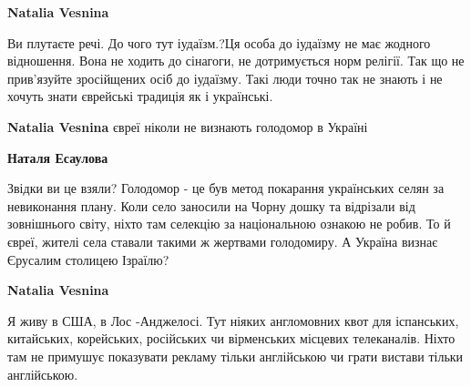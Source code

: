 \begin{itemize}
\begin{itemize}
\begin{itemize}
\textbf{Natalia Vesnina} 

Ви плутаєте речі. До чого тут іудаїзм.?Ця особа до іудаїзму не має жодного
відношення. Вона не ходить до сінагоги, не дотримується норм релігії. Так що не
прив'язуйте зросійщених осіб до іудаїзму. Такі люди точно так не знають і не
хочуть знати єврейські традиція як і українські.

\end{itemize}

 
\textbf{Natalia Vesnina} євреї ніколи не визнають голодомор в Україні

\begin{itemize}
 
\textbf{Наталя Есаулова} 

Звідки ви це взяли? Голодомор - це був метод покарання українських селян за
невиконання плану. Коли село заносили на Чорну дошку та відрізали від
зовнішнього світу, ніхто там селекцію за національною ознакою не робив. То й
євреї, жителі села ставали такими ж жертвами голодомиру. А Україна визнає
Єрусалим столицею Ізраїлю?

\end{itemize}

 
\textbf{Natalia Vesnina} 

Я живу в США, в Лос -Анджелосі. Тут ніяких англомовних квот для іспанських,
китайських, корейських, російських чи вірменських місцевих телеканалів. Ніхто
там не примушує показувати рекламу тільки англійською чи грати вистави тільки
англійською.

\begin{itemize}
 

\end{itemize}
\end{itemize}
\end{itemize}
